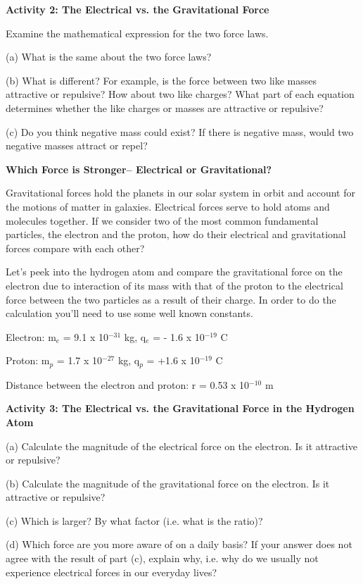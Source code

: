 \textbf{Activity 2: The Electrical vs. the Gravitational Force} 

Examine the mathematical expression for the two force laws.

(a) What is the same about the two force laws?
\answerspace{20mm}

(b) What is different? For example, is the force between two like masses attractive
or repulsive? How about two like charges? What part of each equation determines
whether the like charges or masses are attractive or repulsive?
\answerspace{20mm}

(c) Do you think negative mass could exist? If there is negative mass, would
two negative masses attract or repel?
\answerspace{20mm}

\textbf{Which Force is Stronger-- Electrical or Gravitational?} 

Gravitational forces hold the planets in our solar system in orbit and account
for the motions of matter in galaxies. Electrical forces serve to hold atoms
and molecules together. If we consider two of the most common fundamental particles,
the electron and the proton, how do their electrical and gravitational forces
compare with each other?

Let's peek into the hydrogen atom and compare the gravitational force on the
electron due to interaction of its mass with that of the proton to the electrical
force between the two particles as a result of their charge. In order to do
the calculation you'll need to use some well known constants.

Electron: m\( _{e} \) = 9.1 x 10\( ^{-31} \) kg, q\( _{e} \) = - 1.6 x 10\( ^{-19} \)
C 

Proton: m\( _{p} \) = 1.7 x 10\( ^{-27} \) kg, q\( _{p} \) = +1.6 x 10\( ^{-19} \)
C 

Distance between the electron and proton: r = 0.53 x 10\( ^{-10} \) m

\textbf{Activity 3: The Electrical vs. the Gravitational Force in the Hydrogen
Atom}

(a) Calculate the magnitude of the electrical force on the electron. Is it attractive
or repulsive?
\answerspace{20mm}

(b) Calculate the magnitude of the gravitational force on the electron. Is it
attractive or repulsive?
\answerspace{20mm}

(c) Which is larger? By what factor (i.e. what is the ratio)?
\answerspace{20mm}

(d) Which force are you more aware of on a daily basis? If your answer does
not agree with the result of part (c), explain why, i.e. why do we usually not 
experience electrical forces in our everyday lives?
\answerspace{20mm}

